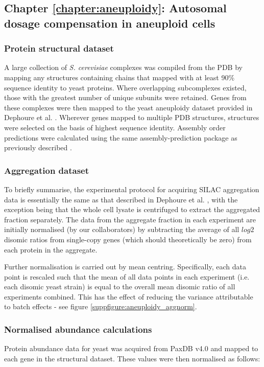 \documentclass[a4paper,11pt,twoside,openright]{scrbook}
\begin{document}
\subsection{Chapter \ref*{chapter:aneuploidy}: Autosomal dosage compensation in aneuploid cells}
\subsubsection{Protein structural dataset}
A large collection of \textit{S. cerevisiae} complexes was compiled from the PDB by mapping any structures containing chains that mapped with at least 90\% sequence identity to yeast proteins. Where overlapping subcomplexes existed, those with the greatest number of unique subunits were retained. Genes from these complexes were then mapped to the yeast aneuploidy dataset provided in Dephoure et al. \cite{Dephoure2014}. Wherever genes mapped to multiple PDB structures, structures were selected on the basis of highest sequence identity. Assembly order predictions were calculated using the same assembly-prediction package as previously described \cite{Wells2016}.


\subsubsection{Aggregation dataset}
To briefly summarise, the experimental protocol for acquiring SILAC aggregation data is essentially the same as that described in Dephoure et al. \cite{Dephoure2014}, with the exception being that the whole cell lysate is centrifuged to extract the aggregated fraction separately. The data from the aggregate fraction in each experiment are initially normalised (by our collaborators) by subtracting the average of all $log{2}$ disomic ratios from single-copy genes (which should theoretically be zero) from each protein in the aggregate.

Further normalisation is carried out by mean centring. Specifically, each data point is rescaled such that the mean of all data points in each experiment (i.e. each disomic yeast strain) is equal to the overall mean disomic ratio of all experiments combined. This has the effect of reducing the variance attributable to batch effects - see figure \ref{suppfigure:aneuploidy_aggnorm}.

\subsubsection{Normalised abundance calculations}
Protein abundance data for yeast was acquired from PaxDB v4.0 \cite{Wang2015} and mapped to each gene in the structural dataset. These values were then normalised as follows:
\end{document}
